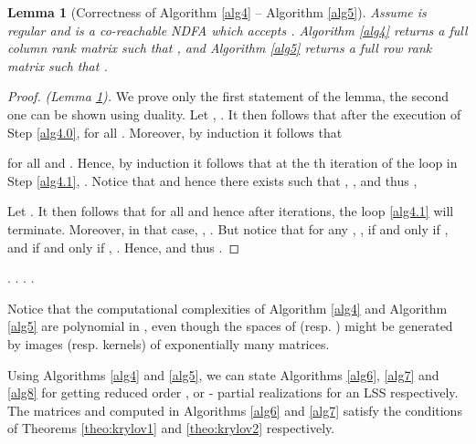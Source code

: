 \documentclass[journal]{IEEEtran}
\newtheorem{Lemma}{Lemma}
\begin{document}
\begin{Lemma}[Correctness of Algorithm \ref{alg4} -- Algorithm \ref{alg5}] \label{lem:correctness}
	Assume  is regular and  is a co-reachable NDFA which accepts . Algorithm \ref{alg4} returns a full column rank matrix  such that , and Algorithm \ref{alg5} returns a full row rank matrix  such that .
\end{Lemma}

\begin{proof}\emph{(Lemma \ref{lem:correctness}).}
	We prove only the first statement of the lemma, the second one can be shown using duality. Let , . It then follows that after the execution of Step \ref{alg4.0},  for all . Moreover, by induction it follows that
	
	for all  and . Hence, by induction it follows that at the th iteration of the loop in Step \ref{alg4.1}, . Notice that  and hence there exists  such that , , and thus ,
	
	Let . It then follows that  for all  and hence after  iterations, the loop \ref{alg4.1} will terminate. Moreover, in that case,  , . But notice that for any , ,  if and only if , and  if and only if , . Hence,  and thus .
\end{proof}

\begin{algorithm}
	\caption{
		Calculate a matrix representation of , 
		\newline
		\textbf{Inputs}:  and  such that , , ,  and   is co-reachable.
		\newline
		\textbf{Outputs:}  such that ,
		.
	}
	\label{alg5}
	\begin{algorithmic}[1]
		\STATE .
		\STATE .
		\STATE .
\label{alg2.0}
		\WHILE{}
		\label{alg2.1}
		\STATE 
		\FOR{}
		\STATE  
		\FOR{}
		\STATE 
		\ENDFOR
		\STATE 
		\ENDFOR
		\IF{}
		\ENDIF
		\ENDWHILE
		\RETURN .
	\end{algorithmic}
\end{algorithm}

Notice that the computational complexities of Algorithm \ref{alg4} and Algorithm \ref{alg5} are polynomial in , even though the spaces of  (resp. ) might be generated by images (resp. kernels) of exponentially many matrices.

Using Algorithms \ref{alg4} and \ref{alg5}, we can state Algorithms \ref{alg6}, \ref{alg7} and \ref{alg8} for getting reduced order ,  or  - partial realizations for an LSS  respectively. The matrices  and  computed in Algorithms \ref{alg6} and \ref{alg7} satisfy the conditions of Theorems \ref{theo:krylov1} and \ref{theo:krylov2} respectively.
\end{document}
